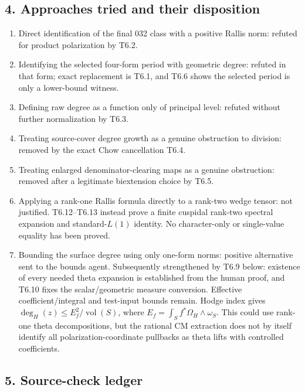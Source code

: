 \documentclass[11pt,a4paper]{article}
\providecommand{\tightlist}{\setlength{\itemsep}{0pt}\setlength{\parskip}{0pt}}
\theoremstyle{definition}
\begin{document}
\subsection{4. Approaches tried and their
disposition}\label{approaches-tried-and-their-disposition}

\begin{enumerate}
\def\labelenumi{\arabic{enumi}.}
\tightlist
\item
  Direct identification of the final 032 class with a positive Rallis
  norm: refuted for product polarization by T6.2.
\item
  Identifying the selected four-form period with geometric degree:
  refuted in that form; exact replacement is T6.1, and T6.6 shows the
  selected period is only a lower-bound witness.
\item
  Defining raw degree as a function only of principal level: refuted
  without further normalization by T6.3.
\item
  Treating source-cover degree growth as a genuine obstruction to
  division: removed by the exact Chow cancellation T6.4.
\item
  Treating enlarged denominator-clearing maps as a genuine obstruction:
  removed after a legitimate biextension choice by T6.5.
\item
  Applying a rank-one Rallis formula directly to a rank-two wedge
  tensor: not justified. T6.12--T6.13 instead prove a finite cuspidal
  rank-two spectral expansion and standard-\(L(1)\) identity. No
  character-only or single-value equality has been proved.
\item
  Bounding the surface degree using only one-form norms: positive
  alternative sent to the bounds agent. Subsequently strengthened by
  T6.9 below: existence of every needed theta expansion is established
  from the human proof, and T6.10 fixes the scalar/geometric measure
  conversion. Effective coefficient/integral and test-input bounds
  remain. Hodge index gives
  \(\deg_H(z)\le E_f^2/\operatorname{vol}(S)\), where
  \(E_f=\int_Sf^*\Omega_H\wedge\omega_S\). This could use rank-one theta
  decompositions, but the rational CM extraction does not by itself
  identify all polarization-coordinate pullbacks as theta lifts with
  controlled coefficients.
\end{enumerate}

\subsection{5. Source-check ledger}\label{source-check-ledger}
\end{document}
